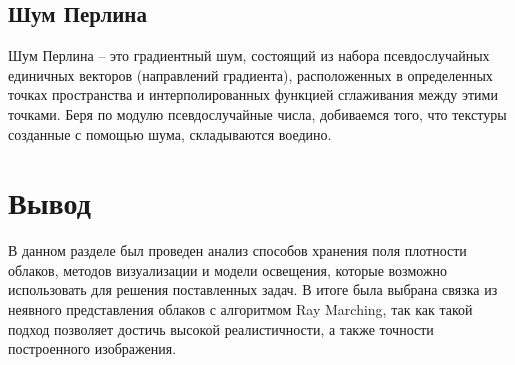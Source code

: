 \subsection{Шум Перлина}

Шум Перлина -- это градиентный шум, состоящий из набора псевдослучайных единичных векторов (направлений градиента), расположенных в определенных точках пространства и интерполированных функцией сглаживания между этими точками. Беря по модулю псевдослучайные числа, добиваемся того, что текстуры созданные с помощью шума, складываются воедино. 


	
	
\section*{Вывод}

В данном разделе был проведен анализ способов хранения поля плотности облаков, методов визуализации и модели освещения, которые возможно использовать для решения поставленных задач. В итоге была выбрана связка из неявного представления облаков с алгоритмом Ray Marching, так как такой подход позволяет достичь высокой реалистичности, а также точности построенного изображения. 








